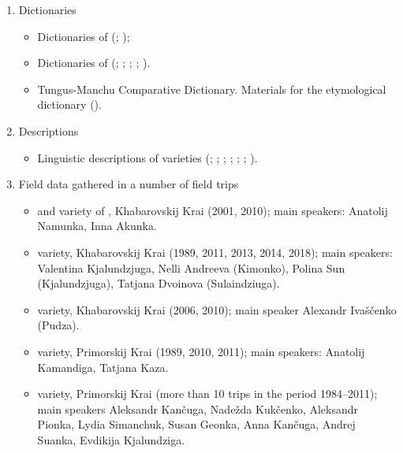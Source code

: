 \documentclass[output=paper,colorlinks,citecolor=brown]{langscibook}
\begin{document}
\begin{enumerate}
    \item Dictionaries

    \begin{itemize}
        \item Dictionaries of  (\citealt{Schmidt1928}; \citealt{AvrorinLebedeva1978});
        \item Dictionaries of  (\citealt{Nadarov1887}; \citealt{Shneider1936}; \citealt{Kormushin1998}; \citealt{SimonovKialundziuga1998}; \citealt{Girfanova2001}).
        \item Tungus-Manchu Comparative Dictionary. Materials for the etymological dictionary (\citealt{Cincius1975P}).
    \end{itemize}


    \item Descriptions

    \begin{itemize}
        \item Linguistic descriptions of  varieties (\citealt{Shneider1936}; \citealt{Sunik1968}; \citealt{Simonov1988}; \citealt{Kormushin1998}; \citealt{Nikolaeva2000}; \citealt{NikolaevaTolskaya2001}; \citealt{Hölzl2018b}).
    \end{itemize}


    \item Field data gathered in a number of field trips

    \begin{itemize}\sloppy
        \item {} and  variety of , Khabarovskij Krai (2001, 2010); main speakers: Anatolij Namunka, Inna Akunka.
    
        \item {} variety, Khabarovskij Krai (1989, 2011, 2013, 2014, 2018); main speakers: Valentina Kjalundzjuga, Nelli Andreeva (Kimonko), Polina Sun (Kjalundzjuga), Tatjana Dvoinova (Sulaindziuga).
    
        \item {} variety, Khabarovskij Krai (2006, 2010); main speaker Alexandr Ivaščenko (Pudza).
    
        \item {} variety, Primorskij Krai (1989, 2010, 2011); main speakers: Anatolij Kamandiga, Tatjana Kaza.
    
        \item {} variety, Primorskij Krai (more than 10 trips in the period 1984--2011); main speakers Aleksandr Kančuga, Nadežda Kukčenko, Aleksandr Pionka, Lydia Simanchuk, Susan Geonka, Anna Kančuga, Andrej Suanka, Evdikija Kjalundziga.
    

\end{itemize}
\end{enumerate}
\end{document}
